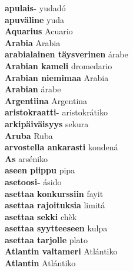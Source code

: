 \textbf{ apulais-  } yudadó \\
\textbf{ apuväline  } yuda \\
\textbf{ Aquarius  } Acuario \\
\textbf{ Arabia  } Arabia \\
\textbf{ arabialainen täysverinen  } árabe \\
\textbf{ Arabian kameli  } dromedario \\
\textbf{ Arabian niemimaa  } Arabia \\
\textbf{ Arabian  } árabe \\
\textbf{ Argentiina  } Argentina \\
\textbf{ aristokraatti-  } aristokrátiko \\
\textbf{ arkipäiväisyys  } sekura \\
\textbf{ Aruba  } Ruba \\
\textbf{ arvostella ankarasti  } kondená \\
\textbf{ As  } arséniko \\
\textbf{ aseen piippu  } pipa \\
\textbf{ asetoosi-  } ásido \\
\textbf{ asettaa konkurssiin  } fayit \\
\textbf{ asettaa rajoituksia  } limitá \\
\textbf{ asettaa sekki  } chèk \\
\textbf{ asettaa syytteeseen  } kulpa \\
\textbf{ asettaa tarjolle  } plato \\
\textbf{ Atlantin valtameri  } Atlántiko \\
\textbf{ Atlantin  } Atlántiko \\
